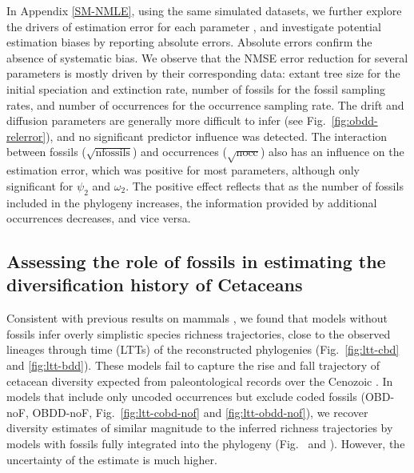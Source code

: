 \documentclass[oupdraft]{sysbio}
\newcommand{\revised}[1]{{\color{blue} #1}}
\begin{document}
In Appendix \ref{SM-NMLE}, \revised{using the same simulated datasets,} we further explore the drivers of estimation error for each parameter\revised{, and investigate potential estimation biases by reporting absolute errors. Absolute errors confirm the absence of systematic bias.} We observe that the \revised{NMSE} error reduction for several parameters is mostly driven by their corresponding data: extant tree size for the initial speciation and extinction rate, number of fossils for the fossil sampling rates, and number of occurrences for the occurrence sampling rate. The drift and diffusion parameters are generally more difficult to infer (see Fig.~\ref{fig:obdd-relerror}), and no significant predictor influence was detected. The interaction between fossils ($\sqrt{\text{nfossils}}$) and occurrences ($\sqrt{\text{nocc}}$) also has an influence on the estimation error, which was positive for most parameters, although only significant for $\psi_2$ and $\omega_2$. The positive effect reflects that as the number of fossils included in the phylogeny increases, the information provided by additional occurrences decreases, and vice versa.

\FloatBarrier
\subsection{Assessing the role of fossils in estimating the diversification history of Cetaceans}

Consistent with previous results on mammals \citep{quintero_imbalanced_2024}, we found that models without fossils infer overly simplistic species richness trajectories, close to the observed lineages through time (LTTs) of the reconstructed phylogenies (Fig.~\ref{fig:ltt-cbd} and \ref{fig:ltt-bdd}). These models fail to capture the rise and fall trajectory of cetacean diversity expected from paleontological records over the Cenozoic \citep{morlon_reconciling_2011, marx_baleen_2015, quintero_loss_2025}. In models that include only \revised{uncoded} occurrences but exclude \revised{coded} fossils (OBD-noF, OBDD-noF, Fig.~\ref{fig:ltt-cobd-nof} and \ref{fig:ltt-obdd-nof}), we recover diversity estimates of similar magnitude to the inferred richness trajectories by models with fossils fully integrated into the phylogeny (Fig.~ and ). However, the uncertainty of the estimate is much higher.
\end{document}
